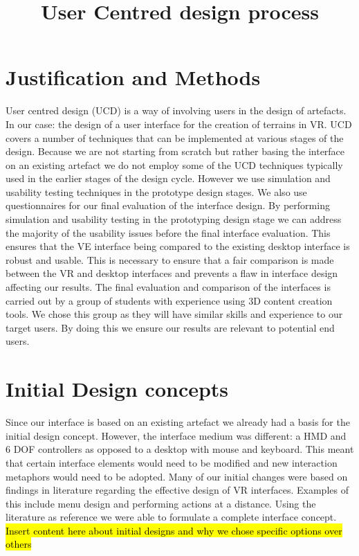 \documentclass{sig-alternate-05-2015}
\title{User Centred design process}
\begin{document}
\maketitle
\section{Justification and Methods}

User centred design (UCD) is a way of involving users in the design of artefacts\cite{abras2004user}. In our case: the design of a user interface for the creation of terrains in VR.
\newline\newline
UCD covers a number of techniques that can be implemented at various stages of the design\cite{abras2004user}. Because we are not starting from scratch but rather basing the interface on an existing artefact we do not employ some of the UCD techniques typically used in the earlier stages of the design cycle. However we use simulation and usability testing techniques in the prototype design stages. We also use questionnaires for our final evaluation of the interface design.
\newline\newline 
By performing simulation and usability testing in the prototyping design stage we can address the majority of the usability issues before the final interface evaluation\cite{Nielsen1990}. This ensures that the VE interface being compared to the existing desktop interface is robust and usable. This is necessary to ensure that a fair comparison is made between the VR and desktop interfaces and prevents a flaw in interface design affecting our results.
\newline\newline
The final evaluation and comparison of the interfaces is carried out by a group of students with experience using 3D content creation tools. We chose this group as they will have similar skills and experience to our target users\cite{Bowman2002}. By doing this we ensure our results are relevant to potential end users.

\section{Initial Design concepts}
Since our interface is based on an existing artefact we already had a basis for the initial design concept. However, the interface medium was different: a HMD and 6 DOF controllers as opposed to a desktop with mouse and keyboard. This meant that certain interface elements would need to be modified and new interaction metaphors would need to be adopted.
\newline\newline
Many of our initial changes were based on findings in literature regarding the effective design of VR interfaces. Examples of this include menu design and performing actions at a distance. Using the literature as reference we were able to formulate a complete interface concept.
\newline\newline
\hl{Insert content here about initial designs and why we chose specific options over others}
\end{document}
